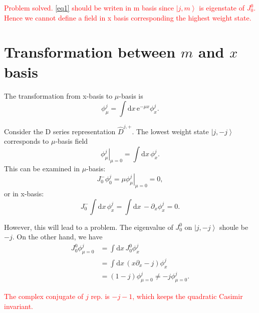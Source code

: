 \documentclass[10pt,a4paper]{article}
\numberwithin{equation}{section}
\newcommand{\ket}[1]{\left| #1 \right\rangle}
\begin{document}
\textcolor{red}{Problem solved. \ref{eq1} should be writen in m basis since $\ket{j,m}$ is eigenstate of $J^{0}_{0}$. Hence we 
cannot define a field in x basis corresponding the highest weight state.}

\section{Transformation between $m$ and $x$ basis}
The transformation from x-basis to $\mu$-basis is 
\begin{equation}
    \phi^{j}_{\mu} = \int \mathrm{d} x \, \mathrm{e}^{- \mu x} \phi^{j}_{x}.
\end{equation}

Consider the D series representation $\hat{D}^{j,+}$. The lowest weight state $\ket{j, -j}$ corresponds to $\mu$-basis field 
\begin{equation}
    \left.\phi^{j}_{\mu}\right|_{\mu = 0} = \int \mathrm{d} x \, \phi^{j}_{x}.
\end{equation}
This can be examined in $\mu$-basis: 
\begin{equation}
    J^{-}_{0} \phi^{j}_{ 0} = \left.\mu \phi^{j}_{\mu}\right|_{\mu = 0} = 0,
\end{equation}
or in x-basis:
\begin{equation}
    J^{-}_{0} \int \mathrm{d} x \, \phi^{j}_{x} = \int \mathrm{d} x \, - \partial_{x} \phi^{j}_{x} = 0.
\end{equation}

However, this will lead to a problem. The eigenvalue of $J^{0}_{0}$ on $\ket{j, -j}$ shoule be $-j$. On the other hand, we have 
\begin{align}
    J^{0}_{0} \phi^{j}_{\mu = 0} & = \int \mathrm{d} x \, J^{0}_{0} \phi^{j}_{x} \\
                                 & = \int \mathrm{d} x \, (x\partial_{x} - j) \phi^{j}_{x}\\
                                 & = (1-j) \phi^{j}_{\mu = 0} \neq -j \phi^{j}_{\mu = 0}.
\end{align}

\textcolor{red}{The complex conjugate of $j$ rep. is $-j-1$, which keeps the quadratic Casimir invariant.}
\end{document}
